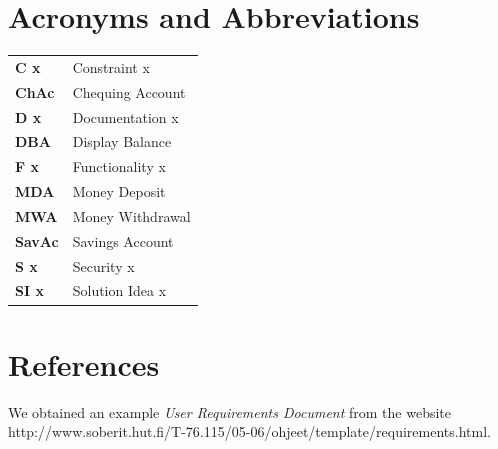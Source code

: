\documentclass[12pt]{article}
\begin{document}
\section{Acronyms and Abbreviations}
\begin{table}[H]
  \begin{tabular}{l l}
    \bf{C} x & Constraint x\\
    \bf{ChAc} & Chequing Account\\
    \bf{D} x & Documentation x\\
    \bf{DBA} & Display Balance\\
    \bf{F} x & Functionality x\\
    \bf{MDA} & Money Deposit\\
    \bf{MWA} & Money Withdrawal\\
    \bf{SavAc} & Savings Account\\
    \bf{S} x & Security x\\
    \bf{SI} x & Solution Idea x\\
  \end{tabular}
\end{table}

\section{References}
We obtained an example \textit{User Requirements Document} from the website http://www.soberit.hut.fi/T-76.115/05-06/ohjeet/template/requirements.html.

\appendix




\end{document}
